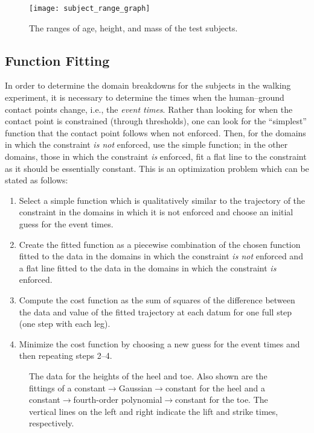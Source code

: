 \begin{figure}[t!]
  \centering
  \texttt{[image: subject\_range\_graph]}
  \caption{The ranges of age, height, and mass of the test subjects.}
  \label{fig:subject-ranges}
\end{figure}

\subsection{Function Fitting}

In order to determine the domain breakdowns for the subjects in the walking
experiment, it is necessary to determine the times when the human--ground
contact points change, i.e., the {\em event times}.
%
Rather than looking for when the contact point is constrained (through
thresholds), one can look for the ``simplest'' function that the contact point
follows when not enforced.
%
Then, for the domains in which the constraint {\em is not} enforced, use the
simple function; in the other domains, those in which the constraint {\em is}
enforced, fit a flat line to the constraint as it should be essentially
constant.
%
This is an optimization problem which can be stated as follows:
\begin{enumerate}
\item Select a simple function which is qualitatively similar to the trajectory
  of the constraint in the domains in which it is not enforced and choose an
  initial guess for the event times.
\item Create the fitted function as a piecewise combination of the chosen
  function fitted to the data in the domains in which the constraint {\em is
    not} enforced and a flat line fitted to the data in the domains in which
  the constraint {\em is} enforced.
\item Compute the cost function as the sum of squares of the difference between
  the data and value of the fitted trajectory at each datum for one full step
  (one step with each leg).
\item Minimize the cost function by choosing a new guess for the event times
  and then repeating steps 2--4.
\end{enumerate}

\begin{figure}[t!]
  \centering
  \caption[The data for the heights of the heel and toe.]{The data for the
    heights of the heel and toe.
    Also shown are the fittings of a constant$\to$Gaussian$\to$constant for the
    heel and a constant$\to$fourth-order polynomial$\to$constant for the toe.
    The vertical lines on the left and right indicate the lift and strike times,
    respectively.}
  \label{fig:heeltoefit}
\end{figure}

